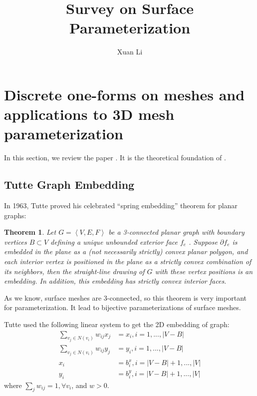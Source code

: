 \documentclass[fleqn,10pt]{wlscirep}
\title{Survey on Surface Parameterization}
\author[1,*]{Xuan Li}
\affil[1]{Department of Computer Science, Stony Brook University}
\affil[*]{SBU ID: 111676019}
\newtheorem{theorem}{Theorem}[section]
\begin{document}
\flushbottom
\maketitle
%
%

\section{Discrete one-forms on meshes and applications to 3D mesh parameterization}

In this section, we review the paper \cite{Gortler:2006:DOM:1133946.1648437}. It is the theoretical foundation of \cite{Aigerman:2015:OTE:2816795.2818099}\cite{Bright:2017:HGP:3072959.3073646}.

\subsection{Tutte Graph Embedding}

In 1963, Tutte proved his celebrated “spring embedding” theorem for planar graphs:
\begin{theorem}\label{tutte-theorem}
Let $G = \left<V , E , F \right>$ be a 3-connected planar graph with boundary vertices $B \subset V$ defining a unique unbounded exterior face $f_e$ . Suppose $\partial f_e$ is embedded in the plane as a (not necessarily strictly) convex planar polygon, and each interior vertex is positioned in the plane as a strictly convex combination of its neighbors, then the straight-line drawing of $G$ with these vertex positions is an embedding. In addition, this embedding has strictly convex interior faces.
\end{theorem}
As we know, surface meshes are 3-connected, so this theorem is very important for parameterization. It lead to bijective parameterizations of surface meshes.

Tutte used the following linear system to get the 2D embedding of graph:
\begin{equation}
\begin{split}
\sum_{v_j \in \mathit{N}(v_i)} w_{ij}x_j &= x_i, i = 1, ..., |V - B|\\
\sum_{v_j \in \mathit{N}(v_i)} w_{ij}y_j &= y_i, i = 1, ..., |V - B|\\
x_i &= b_i^x, i = |V-B| + 1, ... , |V|\\
y_i &= b_i^y, i = |V-B| + 1, ... , |V|
\end{split}
\end{equation}
where $\sum_{j}w_{ij} = 1, \forall v_i$, and $w > 0$.
\end{document}
